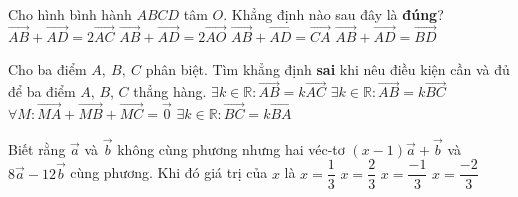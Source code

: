 \begin{ex}%
	Cho hình bình hành $ABCD$ tâm $O$. Khẳng định nào sau đây là \textbf{đúng}?
	\choice
	{$\overrightarrow{AB} + \overrightarrow{AD} = 2 \overrightarrow{AC}$}
	{\True $\overrightarrow{AB} + \overrightarrow{AD} = 2\overrightarrow{AO}$}
	{$\overrightarrow{AB} + \overrightarrow{AD} = \overrightarrow{CA}$}
	{$\overrightarrow{AB} + \overrightarrow{AD}=\overrightarrow{BD}$}
\end{ex}
\begin{ex}%
	Cho ba điểm $A,\ B,\ C$ phân biệt. Tìm khẳng định \textbf{sai} khi nêu điều kiện cần và đủ để ba điểm $A$, $B$, $C$ thẳng hàng.
	\choice
	{$\exists k\in\mathbb{R}\colon \overrightarrow{AB}=k\overrightarrow{AC}$}
	{$\exists k\in\mathbb{R}\colon \overrightarrow{AB}=k\overrightarrow{BC}$}
	{\True $\forall M\colon \overrightarrow{MA}+\overrightarrow{MB}+\overrightarrow{MC}=\overrightarrow{0}$}
	{$\exists k\in\mathbb{R}\colon \overrightarrow{BC}=k\overrightarrow{BA}$}
\end{ex}
\begin{ex}%
Biết rằng $\overrightarrow{a}$ và $\overrightarrow{b}$ không cùng phương nhưng hai véc-tơ $(x-1)\overrightarrow{a}+\overrightarrow{b}$ và $8\overrightarrow{a}-12\overrightarrow{b}$ cùng phương. Khi đó giá trị của $x$ là 	
	\choice
	{\True $x=\dfrac{1}{3}$}
	{$x=\dfrac{2}{3}$}
	{$x=\dfrac{-1}{3}$}
	{$x=\dfrac{-2}{3}$}
\end{ex}
